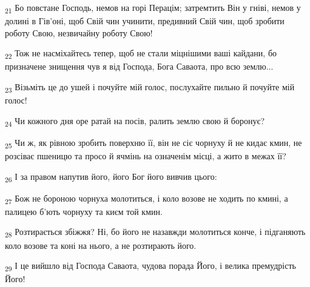 \begin{tcolorbox}
\textsubscript{21} Бо повстане Господь, немов на горі Перацім; затремтить Він у гніві, немов у долині в Гів'оні, щоб Свій чин учинити, предивний Свій чин, щоб зробити роботу Свою, незвичайну роботу Свою!
\end{tcolorbox}
\begin{tcolorbox}
\textsubscript{22} Тож не насміхайтесь тепер, щоб не стали міцнішими ваші кайдани, бо призначене знищення чув я від Господа, Бога Саваота, про всю землю...
\end{tcolorbox}
\begin{tcolorbox}
\textsubscript{23} Візьміть це до ушей і почуйте мій голос, послухайте пильно й почуйте мій голос!
\end{tcolorbox}
\begin{tcolorbox}
\textsubscript{24} Чи кожного дня оре ратай на посів, ралить землю свою й боронує?
\end{tcolorbox}
\begin{tcolorbox}
\textsubscript{25} Чи ж, як рівною зробить поверхню її, він не сіє чорнуху й не кидає кмин, не розсіває пшеницю та просо й ячмінь на означенім місці, а жито в межах її?
\end{tcolorbox}
\begin{tcolorbox}
\textsubscript{26} І за правом напутив його, його Бог його вивчив цього:
\end{tcolorbox}
\begin{tcolorbox}
\textsubscript{27} Бож не бороною чорнуха молотиться, і коло возове не ходить по кмині, а палицею б'ють чорнуху та києм той кмин.
\end{tcolorbox}
\begin{tcolorbox}
\textsubscript{28} Розтирається збіжжя? Ні, бо його не назавжди молотиться конче, і підганяють коло возове та коні на нього, а не розтирають його.
\end{tcolorbox}
\begin{tcolorbox}
\textsubscript{29} І це вийшло від Господа Саваота, чудова порада Його, і велика премудрість Його!
\end{tcolorbox}
